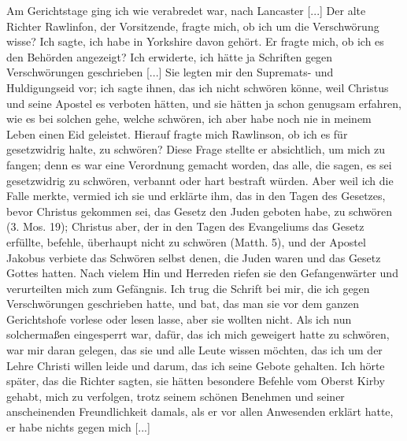 Am Gerichtstage ging ich wie verabredet war, nach Lancaster [...]
Der alte Richter Rawlinfon, der Vorsitzende, fragte mich, ob ich
um die Verschwörung wisse? Ich sagte, ich habe in Yorkshire
davon gehört. Er fragte mich, ob ich es den Behörden angezeigt? 
Ich erwiderte, ich hätte ja Schriften gegen Verschwörungen
geschrieben [...] Sie legten mir den Supremats- und Huldigungseid 
vor; ich sagte ihnen, das ich nicht schwören könne, weil
Christus und seine Apostel es verboten hätten, und sie hätten ja
schon genugsam erfahren, wie es bei solchen gehe, welche schwören,
ich aber habe noch nie in meinem Leben einen Eid geleistet. Hierauf
fragte mich Rawlinson, ob ich es für gesetzwidrig halte, zu
schwören? Diese Frage stellte er absichtlich, um mich zu fangen;
denn es war eine Verordnung gemacht worden, das alle, die
sagen, es sei gesetzwidrig zu schwören, verbannt oder hart bestraft
würden. Aber weil ich die Falle merkte, vermied ich sie und erklärte 
ihm, das in den Tagen des Gesetzes, bevor Christus gekommen sei, 
das Gesetz den Juden geboten habe, zu schwören
(3. Mos. 19); Christus aber, der in den 
Tagen des Evangeliums
das Gesetz erfüllte, befehle, überhaupt nicht zu schwören 
(Matth. 5),
und der Apostel Jakobus verbiete das Schwören selbst denen, die
Juden waren und das Gesetz Gottes hatten. Nach vielem Hin und 
Herreden riefen sie den Gefangenwärter und verurteilten mich
zum Gefängnis. Ich trug die Schrift bei mir, die ich gegen
Verschwörungen geschrieben hatte, und bat, das man sie vor dem
ganzen Gerichtshofe vorlese oder lesen lasse, aber sie wollten nicht.
Als ich nun solchermaßen eingesperrt war, dafür, das ich mich
geweigert hatte zu schwören, war mir daran gelegen, das sie und
alle Leute wissen möchten, das ich um der Lehre Christi willen
leide und darum, das ich seine Gebote gehalten. Ich hörte später,
das die Richter sagten, sie hätten besondere Befehle vom Oberst
Kirby gehabt, mich zu verfolgen, trotz seinem schönen Benehmen
und seiner anscheinenden Freundlichkeit damals, als er vor allen
Anwesenden erklärt hatte, er habe nichts gegen mich [...]

